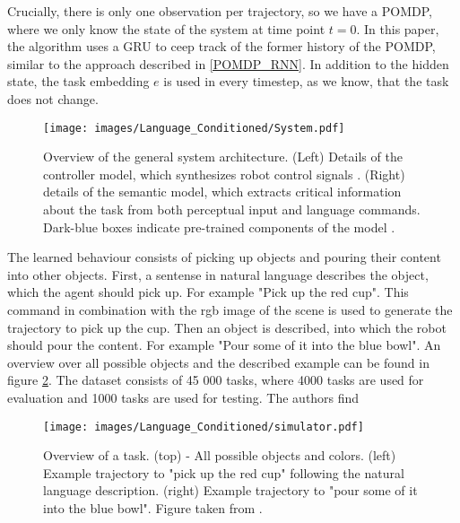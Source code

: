 Crucially, there is only one observation per trajectory, so we have a POMDP, where we only know the state of the system at time point $t=0$. In this paper, the 
algorithm uses a GRU to ceep track of the former history of the POMDP, similar to the approach described in \ref{POMDP_RNN}. In addition to the hidden state, 
the task embedding $e$ is used in every timestep, as we know, that the task does not change. \\

\begin{figure}[htbp]
    \centering
    \texttt{[image: images/Language\_Conditioned/System.pdf]}
    \caption{Overview of the general system architecture. (Left) Details of the controller model, which
    synthesizes robot control signals . (Right) details of the semantic model, which extracts critical
    information about the task from both perceptual input and language commands. Dark-blue boxes
    indicate pre-trained components of the model \cite{Language-Conditioned Imitation}.}
    \label{language_imitation}
\end{figure}

The learned behaviour consists of picking up objects and pouring their content into other objects. First, a sentense in natural language describes the object, which 
the agent should pick up. For example "Pick up the red cup". This command in combination with the rgb image of the scene is used to generate the trajectory to 
pick up the cup. Then an object is described, into which the robot should pour the content. For example "Pour some of it into the blue bowl". An overview over 
all possible objects and the described example can be found in figure \ref{lang_imi_expl}. The dataset consists of 45 000 tasks, where 4000 tasks are used for 
evaluation and 1000 tasks are used for testing. The authors find 

\begin{figure}[htbp]
    \centering
    \texttt{[image: images/Language\_Conditioned/simulator.pdf]}
    \caption{Overview of a task. (top) - All possible objects and colors. (left) Example trajectory to "pick up the red cup" following the natural language description. 
    (right) Example trajectory to "pour some of it into the blue bowl". Figure taken from \cite{Language-Conditioned Imitation}.}
    \label{lang_imi_expl}
\end{figure}